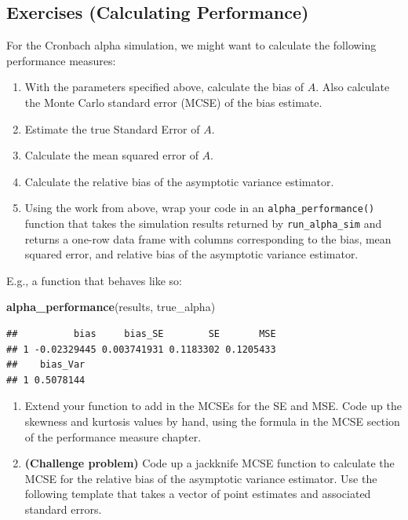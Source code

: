 \documentclass[
]{book}
\newenvironment{Shaded}{\begin{snugshade}}{\end{snugshade}}
\newcommand{\FunctionTok}[1]{\textcolor[rgb]{0.13,0.29,0.53}{\textbf{#1}}}
\newcommand{\NormalTok}[1]{#1}
\begin{document}
\subsection{Exercises (Calculating Performance)}\label{exercises-calculating-performance}

For the Cronbach alpha simulation, we might want to calculate the following performance measures:

\begin{enumerate}
\def\labelenumi{\arabic{enumi}.}
\item
  With the parameters specified above, calculate the bias of \(A\). Also calculate the Monte Carlo standard error (MCSE) of the bias estimate.
\item
  Estimate the true Standard Error of \(A\).
\item
  Calculate the mean squared error of \(A\).
\item
  Calculate the relative bias of the asymptotic variance estimator.
\item
  Using the work from above, wrap your code in an \texttt{alpha\_performance()} function that takes the simulation results returned by \texttt{run\_alpha\_sim} and returns a one-row data frame with columns corresponding to the bias, mean squared error, and relative bias of the asymptotic variance estimator.
\end{enumerate}

E.g., a function that behaves like so:

\begin{Shaded}
\begin{Highlighting}[]
\FunctionTok{alpha\_performance}\NormalTok{(results, true\_alpha)}
\end{Highlighting}
\end{Shaded}

\begin{verbatim}
##          bias     bias_SE        SE       MSE
## 1 -0.02329445 0.003741931 0.1183302 0.1205433
##    bias_Var
## 1 0.5078144
\end{verbatim}

\begin{enumerate}
\def\labelenumi{\arabic{enumi}.}
\setcounter{enumi}{5}
\item
  Extend your function to add in the MCSEs for the SE and MSE. Code up the skewness and kurtosis values by hand, using the formula in the MCSE section of the performance measure chapter.
\item
  \textbf{(Challenge problem)} Code up a jackknife MCSE function to calculate the MCSE for the relative bias of the asymptotic variance estimator.
  Use the following template that takes a vector of point estimates and associated standard errors.
\end{enumerate}
\end{document}
